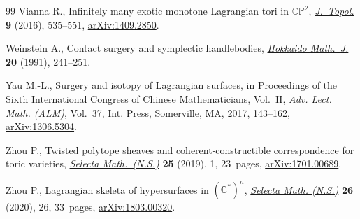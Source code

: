 \documentclass[pdftex]{sigma}%
\numberwithin{equation}{section}
\begin{document}
\begin{thebibliography}{99}
Vianna R., Infinitely many exotic monotone {L}agrangian tori in
 {$\mathbb{CP}^2$}, \href{https://doi.org/10.1112/jtopol/jtw002}{\textit{J.~Topol.}} \textbf{9} (2016), 535--551,
 \href{https://arxiv.org/abs/1409.2850}{arXiv:1409.2850}.

Weinstein A., Contact surgery and symplectic handlebodies, \href{https://doi.org/10.14492/hokmj/1381413841}{\textit{Hokkaido
 Math.~J.}} \textbf{20} (1991), 241--251.

Yau M.-L., Surgery and isotopy of {L}agrangian surfaces, in Proceedings of the
 {S}ixth {I}nternational {C}ongress of {C}hinese {M}athematicians,
 {V}ol.~{II}, \textit{Adv. Lect. Math. (ALM)}, Vol.~37, Int. Press,
 Somerville, MA, 2017, 143--162, \href{https://arxiv.org/abs/1306.5304}{arXiv:1306.5304}.

Zhou P., Twisted polytope sheaves and coherent-constructible correspondence for
 toric varieties, \href{https://doi.org/10.1007/s00029-019-0459-x}{\textit{Selecta Math.~(N.S.)}} \textbf{25} (2019), 1,
 23~pages, \href{https://arxiv.org/abs/1701.00689}{arXiv:1701.00689}.

Zhou P., Lagrangian skeleta of hypersurfaces in {$(\mathbb C^*)^n$},
 \href{https://doi.org/10.1007/s00029-020-00555-9}{\textit{Selecta Math. (N.S.)}} \textbf{26} (2020), 26, 33~pages,
 \href{https://arxiv.org/abs/1803.00320}{arXiv:1803.00320}.

\end{thebibliography}\LastPageEnding
\end{document}
